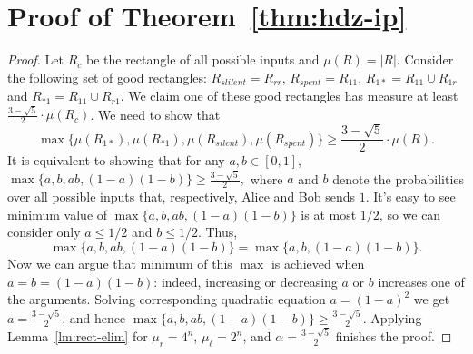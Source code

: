 \section{Proof of Theorem~\ref{thm:hdz-ip}}
\begin{proof}
	Let $R_c$ be the rectangle of all possible inputs and $\mu(R) = |R|$.
	Consider the following set of good rectangles: $R_{slilent} = R_{rr}$, $R_{spent} = R_{11}$, $R_{1*} = R_{11}\cup R_{1r}$ and $R_{*1} = R_{11}\cup R_{r1}$.
	We claim one of these good rectangles has measure at least 
	$\frac{3 - \sqrt{5}}{2}\cdot \mu(R_c)$. We need to show that 
	\[
	\max\bigl\{ \mu(R_{1*}),\mu(R_{*1}),\mu(R_{silent}),\mu(R_{spent})\bigr\}\ge \frac{3 - \sqrt{5}}{2}\cdot\mu(R).
	\]
	It is equivalent to showing that for any $a,b \in [0,1]$,
	$\max\bigl\{a,b,a b,(1-a)(1-b)\bigr\}\ge \frac{3 - \sqrt{5}}{2},$
	where $a$ and $b$ denote the probabilities over all possible inputs that, 
	respectively, Alice and Bob sends $1$. It's easy to see minimum value of $\max\bigl\{a,b,a b,(1-a)(1-b)\bigr\}$ is at most $1/2$, so we can consider only $a\le 1/2$ and $b\le 1/2$. Thus,
	\[
	\max\bigl\{a,b,a b,(1-a)(1-b)\bigr\} = 
	\max\bigl\{a,b,(1-a)(1-b)\bigr\}.
	\]
	Now we can argue that minimum of this $\max$ is achieved when 
	$a = b = (1-a) (1-b)$: indeed, increasing or decreasing $a$ or $b$ increases one of the arguments. 
	Solving corresponding quadratic equation $a = (1-a)^2$ we get $a = \frac{3 - \sqrt{5}}{2}$, and hence 
	$\max\bigl\{a,b,a b,(1-a)(1-b)\bigr\} \ge \frac{3 - \sqrt{5}}{2}.$
	Applying Lemma~\ref{lm:rect-elim} for $\mu_r = 4^n$, $\mu_\ell = 2^n$, and $\alpha=\frac{3 - \sqrt{5}}{2}$ finishes the proof.
\end{proof}

